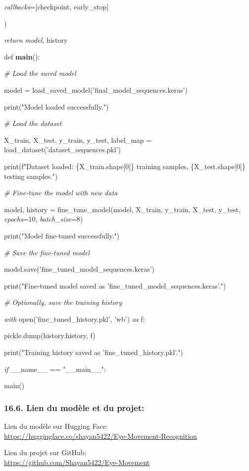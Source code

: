 \documentclass[
]{article}
\begin{document}
\emph{callbacks}={[}checkpoint, early\_stop{]}

)

\emph{return} \emph{model}, history

def \textbf{main}():

\emph{\# Load the saved model}

model = load\_saved\_model('final\_model\_sequences.keras')

print("Model loaded successfully.")

\emph{\# Load the dataset}

X\_train, X\_test, y\_train, y\_test, label\_map = load\_dataset('dataset\_sequences.pkl')

print(f"Dataset loaded: \{X\_train.shape{[}0{]}\} training samples, \{X\_test.shape{[}0{]}\} testing samples.")

\emph{\# Fine-tune the model with new data}

model, history = fine\_tune\_model(model, X\_train, y\_train, X\_test, y\_test, \emph{epochs}=10, \emph{batch\_size}=8)

print("Model fine-tuned successfully.")

\emph{\# Save the fine-tuned model}

model.save('fine\_tuned\_model\_sequences.keras')

print("Fine-tuned model saved as 'fine\_tuned\_model\_sequences.keras'.")

\emph{\# Optionally, save the training history}

\emph{with} open('fine\_tuned\_history.pkl', 'wb') \emph{as} f:

pickle.dump(history.history, f)

print("Training history saved as 'fine\_tuned\_history.pkl'.")

\emph{if} \_\_name\_\_ == "\_\_main\_\_":

main()

\hypertarget{lien-du-moduxe8le-et-du-projet}{%
\subsubsection{16.6. Lien du modèle et du projet:}\label{lien-du-moduxe8le-et-du-projet}}

Lien du modèle sur Hugging Face:\\
\underline{https://huggingface.co/shayan5422/Eye-Movement-Recognition}

Lien du projet sur GitHub:\\
\underline{https://github.com/Shayan5422/Eye-Movement}{}
\end{document}
